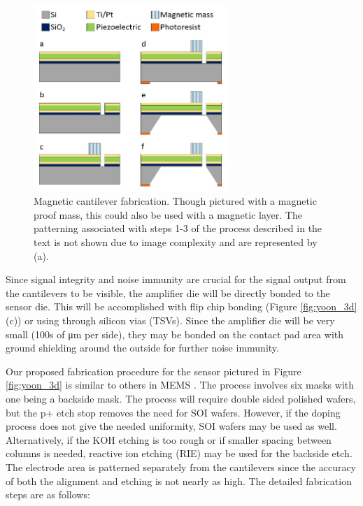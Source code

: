 \begin{figure}[H]
\centering
\includegraphics[width=0.65\textwidth]{yoon_process}
\caption{Magnetic cantilever fabrication. Though pictured with a magnetic proof mass, this could also be used with a magnetic layer. The patterning associated with steps 1-3 of the process described in the text is not shown due to image complexity and are represented by (a).}
\label{fig:yoon_process}
\end{figure}

Since signal integrity and noise immunity are crucial for the signal output from the cantilevers to be visible, the amplifier die will be directly bonded to the sensor die. This will be accomplished with flip chip bonding (Figure \ref{fig:yoon_3d}(c)) or using through silicon vias (TSVs). Since the amplifier die will be very small (100s of μm per side), they may be bonded on the contact pad area with ground shielding around the outside for further noise immunity.

Our proposed fabrication procedure for the sensor pictured in Figure \ref{fig:yoon_3d} is similar to others in MEMS \cite{shen2008design}. The process involves six masks with one being a backside mask. The process will require double sided polished wafers, but the p+ etch stop removes the need for SOI wafers. However, if the doping process does not give the needed uniformity, SOI wafers may be used as well. Alternatively, if the KOH etching is too rough or if smaller spacing between columns is needed, reactive ion etching (RIE) may be used for the backside etch. The electrode area is patterned separately from the cantilevers since the accuracy of both the alignment and etching is not nearly as high. The detailed fabrication steps are as follows:


